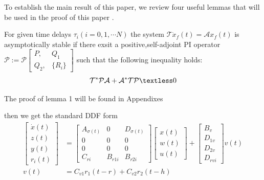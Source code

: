 \documentclass[twocolumn]{autart}    %
\begin{document}
To establish the main result of this paper, we review four useful lemmas that will be used in the proof of this paper .
\begin{lem}
    [c]For given time delays $\tau_{i}(i=0,1,\cdots N)$ the system $\mathcal{T}\dot{x}_{f}(t) = \mathcal{A}x_{f}(t)$ is asymptotically stable 
    if there exsit a positive,self-adjoint PI operator $\mathcal{P}:=\mathcal{P}\begin{bmatrix}
        P,&Q_{1}\\
        Q_{2},&\{R_{i}\}
    \end{bmatrix}$ such that the following inequality holds:
    \begin{equation}
        \mathcal{T}^{*}\mathcal{P}\mathcal{A}+\mathcal{A}^{*}\mathcal{T}\mathcal{P} \textless 0
    \end{equation}
\end{lem}
    The proof of lemma 1 will be found in Appendixes

\begin{lem}[c]
    then we get the standard DDF form
\begin{equation}
    \begin{aligned}
        \begin{bmatrix}
            \dot{x}(t) \\
            z(t) \\
            y(t) \\
            r_{i}(t)
        \end{bmatrix} & = \begin{bmatrix}
            A_{\sigma(t)} & 0 & D_{\sigma(t)}\\
            0 & 0 & 0\\
            0 & 0 & 0\\
            C_{ri} & B_{r1i} & B_{r2i}
        \end{bmatrix}\begin{bmatrix}
            x(t) \\
            w(t) \\
            u(t) 
        \end{bmatrix} 
        +  \begin{bmatrix}
            B_{v} \\
            D_{1v} \\
            D_{2v} \\
            D_{rvi}
        \end{bmatrix}v(t)\\
        v(t) &= C_{v1}r_{1}(t-r) + C_{v2}r_{2}(t-h)
    \end{aligned}
\end{equation}
\end{lem}
\end{document}
